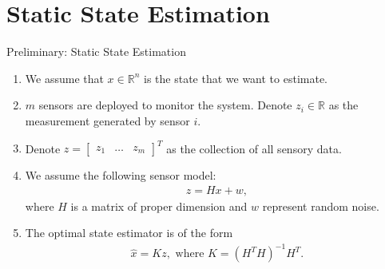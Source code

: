 \documentclass[10pt]{beamer}
\begin{document}

  


\section{Static State Estimation}

\begin{frame}{Preliminary: Static State Estimation}
  \begin{enumerate}
  \item We assume that $x \in \mathbb R^n$ is the state that we want to estimate.
  \item $m$ sensors are deployed to monitor the system. Denote $z_i \in \mathbb R$ as the measurement generated by sensor $i$.
  \item Denote $z = \begin{bmatrix}z_1&\dots&z_m\end{bmatrix}^T$ as the collection of all sensory data.
  \item We assume the following sensor model:
    \begin{align*}
      z = Hx + w,
    \end{align*}
    where $H$ is a matrix of proper dimension and $w$ represent random noise.
  \item The optimal state estimator is of the form
    \begin{align*}
      \hat x = Kz, \text{ where }K = (H^TH)^{-1}H^T.
    \end{align*}
  \end{enumerate}
\end{frame}
\end{document}
